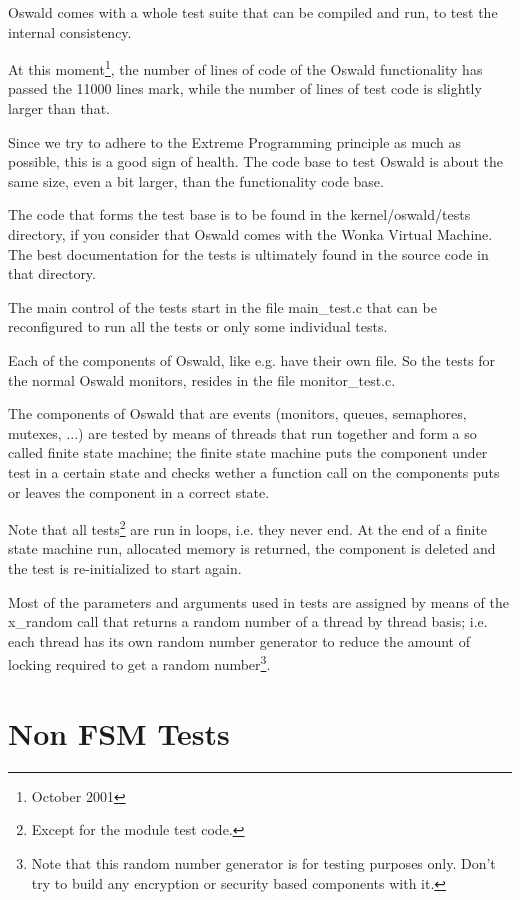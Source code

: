 Oswald comes with a whole test suite that can be compiled and run, to test
the internal consistency. 

At this moment\footnote{October 2001}, the number of lines of code of the
Oswald functionality has passed the 11000 lines mark, while the number of
lines of test code is slightly larger than that.

Since we try to adhere to the Extreme Programming principle as much as
possible, this is a good sign of health. The code base to test Oswald is
about the same size, even a bit larger, than the functionality code base.

The code that forms the test base is to be found in the
\textsf{kernel/oswald/tests} directory, if you consider that Oswald comes
with the Wonka Virtual Machine.
The best documentation for the tests is ultimately found in the source code
in that directory.

The main control of the tests start in the file \textsf{main\_test.c} that
can be reconfigured to run all the tests or only some individual tests.

Each of the components of Oswald, like e.g. have their own file. So the
tests for the normal Oswald monitors, resides in the file
\textsf{monitor\_test.c}.

The components of Oswald that are events (monitors, queues, semaphores,
mutexes, ...) are tested by means of threads that run together and form a so
called finite state machine; the finite state machine puts the component
under test in a certain state and checks wether a function call on the
components puts or leaves the component in a correct state.

Note that all tests\footnote{Except for the module test code.} are run in
loops, i.e. they never end. At the end of a finite state machine run,
allocated memory is returned, the component is deleted and the test is
re-initialized to start again.

Most of the parameters and arguments used in tests are assigned by means of
the \textsf{x\_random} call that returns a random number of a thread by
thread basis; i.e. each thread has its own random number generator to reduce
the amount of locking required to get a random number\footnote{Note that
this random number generator is for testing purposes only. Don't try to
build any encryption or security based components with it.}.

\section{Non FSM Tests}

